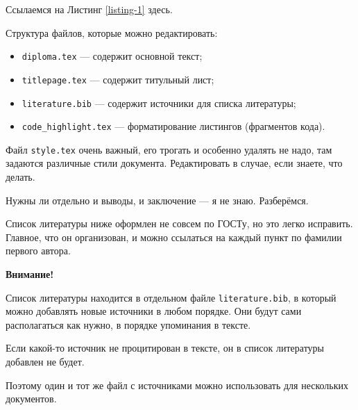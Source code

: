 \documentclass[14pt,oneside]{extarticle}
\begin{document}
Ссылаемся на Листинг \ref{listing-1} здесь.

\pagebreak
{}
Структура файлов, которые можно редактировать:

\begin{itemize}
    \item \verb|diploma.tex| --- содержит основной текст;
    \item \verb|titlepage.tex| --- содержит титульный лист;
    \item \verb|literature.bib| --- содержит источники для списка литературы;
    \item \verb|code_highlight.tex| --- форматирование листингов (фрагментов кода).
\end{itemize}

Файл \verb|style.tex| очень важный, его трогать и особенно удалять не надо, там задаются различные стили документа. Редактировать в случае, если знаете, что делать.


Нужны ли отдельно и выводы, и заключение --- я не знаю. Разберёмся.

Список литературы ниже оформлен не совсем по ГОСТу, но это легко исправить. Главное, что он организован, и можно ссылаться на каждый пункт по фамилии первого автора.

\textbf{Внимание!} 

Список литературы находится в отдельном файле \verb|literature.bib|, в который можно добавлять новые источники в любом порядке. Они будут сами располагаться как нужно, в порядке упоминания в тексте.

Если какой-то источник не процитирован в тексте, он в список литературы добавлен не будет.

Поэтому один и тот же файл с источниками можно использовать для нескольких документов.


\pagebreak
\printbibliography
\end{document}
